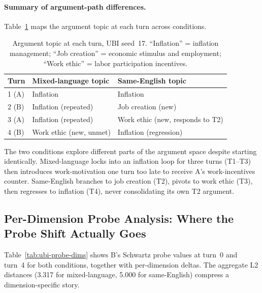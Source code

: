 \documentclass{article}
\begin{document}
\paragraph{Summary of argument-path differences.}
Table~\ref{tab:turn-paths} maps the argument topic at each turn across conditions.

\begin{table}[h]
\centering
\caption{Argument topic at each turn, UBI seed~17. ``Inflation'' = inflation management; ``Job creation'' = economic stimulus and employment; ``Work ethic'' = labor participation incentives.}
\label{tab:turn-paths}
\begin{tabular}{lll}
\toprule
Turn & Mixed-language topic & Same-English topic \\
\midrule
1 (A) & Inflation           & Inflation \\
2 (B) & Inflation (repeated) & Job creation (new) \\
3 (A) & Inflation (repeated) & Work ethic (new, responds to T2) \\
4 (B) & Work ethic (new, unmet) & Inflation (regression) \\
\bottomrule
\end{tabular}
\end{table}

The two conditions explore different parts of the argument space despite starting identically. Mixed-language locks into an inflation loop for three turns (T1--T3) then introduces work-motivation one turn too late to receive A's work-incentives counter. Same-English branches to job creation (T2), pivots to work ethic (T3), then regresses to inflation (T4), never consolidating its own T2 argument.

\subsection{Per-Dimension Probe Analysis: Where the Probe Shift Actually Goes}
\label{sec:ubi-probe-dimensions}

Table~\ref{tab:ubi-probe-dims} shows B's Schwartz probe values at turn~0 and turn~4 for both conditions, together with per-dimension deltas. The aggregate L2 distances (3.317 for mixed-language, 5.000 for same-English) compress a dimension-specific story.
\end{document}

